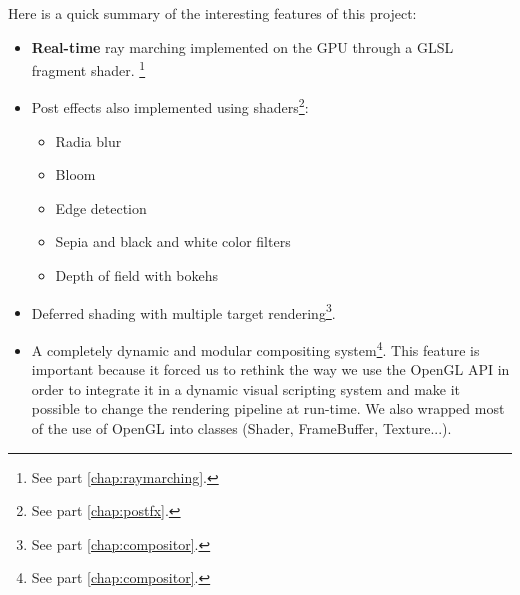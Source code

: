     Here is a quick summary of the interesting features of this project:
    \begin{itemize}
        \item \textbf{Real-time} ray marching implemented on the GPU through a GLSL fragment shader. \footnote{See part \ref{chap:raymarching}.}
        \item Post effects also implemented using shaders\footnote{See part \ref{chap:postfx}.}:
        \begin{itemize}
            \item Radia blur
            \item Bloom
            \item Edge detection
            \item Sepia and black and white color filters
            \item Depth of field with bokehs
        \end{itemize}
        \item Deferred shading with multiple target rendering\footnote{See part \ref{chap:compositor}.}. 
        \item A completely dynamic and modular compositing system\footnote{See part \ref{chap:compositor}.}. This feature is
        important because it forced us to rethink the way we use the OpenGL API
        in order to integrate it in a dynamic visual scripting system and make it
        possible to change the rendering pipeline at run-time. We also wrapped
        most of the use of OpenGL into classes (Shader, FrameBuffer, Texture...).
    \end{itemize}

